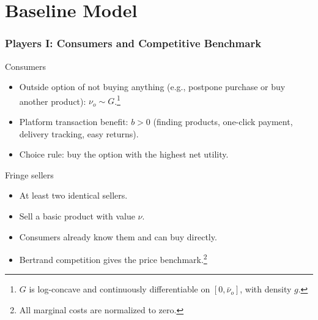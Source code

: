 ﻿\section{Baseline Model}

\begin{frame}
  \frametitle{Players I: Consumers and Competitive Benchmark}
  \footnotesize

  \begin{block}{Consumers}
    \begin{itemize}
      \item Outside option of not buying anything (e.g., postpone purchase or buy another product): $\nu_o \sim G$.\footnote{$G$ is log-concave and continuously differentiable on $[0,\bar{\nu}_o]$, with density $g$.}
      \item Platform transaction benefit: $b>0$ (finding products, one-click payment, delivery tracking, easy returns).
      \item Choice rule: buy the option with the highest net utility.
    \end{itemize}
  \end{block}

  \begin{block}{Fringe sellers}
    \begin{itemize}
      \item At least two identical sellers.
      \item Sell a basic product with value $\nu$.
      \item Consumers already know them and can buy directly.
      \item Bertrand competition gives the price benchmark.\footnote{All marginal costs are normalized to zero.}
    \end{itemize}
  \end{block}
\end{frame}

